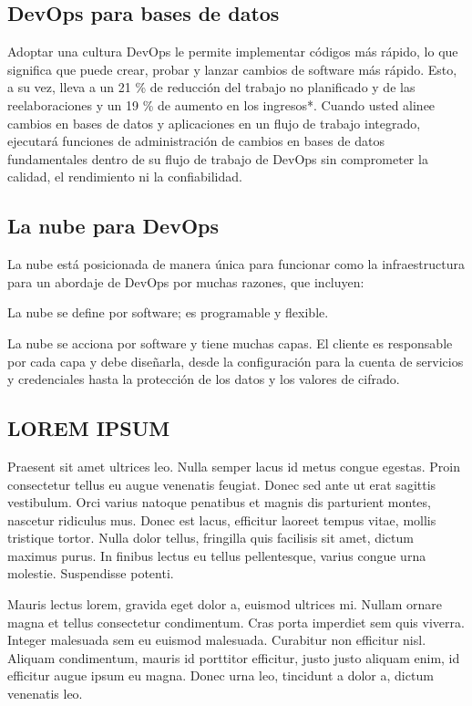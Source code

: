 \documentclass[preprint,12pt]{elsarticle}
\begin{document}
\subsection{DevOps para bases de datos}	


Adoptar una cultura DevOps le permite implementar códigos más rápido, lo que significa que puede crear, probar y lanzar cambios de software más rápido. Esto, a su vez, lleva a un 21 \% de reducción del trabajo no planificado y de las reelaboraciones y un 19 \% de aumento en los ingresos*. Cuando usted alinee cambios en bases de datos y aplicaciones en un flujo de trabajo integrado, ejecutará funciones de administración de cambios en bases de datos fundamentales dentro de su flujo de trabajo de DevOps sin comprometer la calidad, el rendimiento ni la confiabilidad.


\subsection{La nube para DevOps}

La nube está posicionada de manera única para funcionar como la infraestructura para un abordaje de DevOps por muchas razones, que incluyen:
\begin{item}

\item La nube se define por software; es programable y flexible.
\item La nube se acciona por software y tiene muchas capas. El cliente es responsable por cada capa y debe diseñarla, desde la configuración para la cuenta de servicios y credenciales hasta la protección de los datos y los valores de cifrado.
\end{item} 


\subsection{LOREM IPSUM}
	
Praesent sit amet ultrices leo. Nulla semper lacus id metus congue egestas. Proin consectetur tellus eu augue venenatis feugiat. Donec sed ante ut erat sagittis vestibulum. Orci varius natoque penatibus et magnis dis parturient montes, nascetur ridiculus mus. Donec est lacus, efficitur laoreet tempus vitae, mollis tristique tortor. Nulla dolor tellus, fringilla quis facilisis sit amet, dictum maximus purus. In finibus lectus eu tellus pellentesque, varius congue urna molestie. Suspendisse potenti.

Mauris lectus lorem, gravida eget dolor a, euismod ultrices mi. Nullam ornare magna et tellus consectetur condimentum. Cras porta imperdiet sem quis viverra. Integer malesuada sem eu euismod malesuada. Curabitur non efficitur nisl. Aliquam condimentum, mauris id porttitor efficitur, justo justo aliquam enim, id efficitur augue ipsum eu magna. Donec urna leo, tincidunt a dolor a, dictum venenatis leo.
\end{document}
